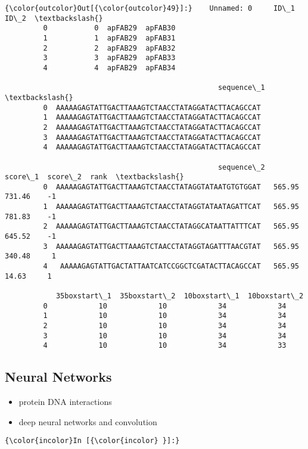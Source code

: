 \documentclass[11pt]{article}
\providecommand{\tightlist}{%
      \setlength{\itemsep}{0pt}\setlength{\parskip}{0pt}}
\begin{document}
            \begin{Verbatim}[commandchars=\\\{\}]
{\color{outcolor}Out[{\color{outcolor}49}]:}    Unnamed: 0     ID\_1     ID\_2  \textbackslash{}
         0           0  apFAB29  apFAB30   
         1           1  apFAB29  apFAB31   
         2           2  apFAB29  apFAB32   
         3           3  apFAB29  apFAB33   
         4           4  apFAB29  apFAB34   
         
                                                  sequence\_1  \textbackslash{}
         0  AAAAAGAGTATTGACTTAAAGTCTAACCTATAGGATACTTACAGCCAT   
         1  AAAAAGAGTATTGACTTAAAGTCTAACCTATAGGATACTTACAGCCAT   
         2  AAAAAGAGTATTGACTTAAAGTCTAACCTATAGGATACTTACAGCCAT   
         3  AAAAAGAGTATTGACTTAAAGTCTAACCTATAGGATACTTACAGCCAT   
         4  AAAAAGAGTATTGACTTAAAGTCTAACCTATAGGATACTTACAGCCAT   
         
                                                  sequence\_2  score\_1  score\_2  rank  \textbackslash{}
         0  AAAAAGAGTATTGACTTAAAGTCTAACCTATAGGTATAATGTGTGGAT   565.95   731.46    -1   
         1  AAAAAGAGTATTGACTTAAAGTCTAACCTATAGGTATAATAGATTCAT   565.95   781.83    -1   
         2  AAAAAGAGTATTGACTTAAAGTCTAACCTATAGGCATAATTATTTCAT   565.95   645.52    -1   
         3  AAAAAGAGTATTGACTTAAAGTCTAACCTATAGGTAGATTTAACGTAT   565.95   340.48     1   
         4   AAAAAGAGTATTGACTATTAATCATCCGGCTCGATACTTACAGCCAT   565.95    14.63     1   
         
            35boxstart\_1  35boxstart\_2  10boxstart\_1  10boxstart\_2  
         0            10            10            34            34  
         1            10            10            34            34  
         2            10            10            34            34  
         3            10            10            34            34  
         4            10            10            34            33  
\end{Verbatim}
        
    \subsection{Neural Networks}\label{neural-networks}

\begin{itemize}
\tightlist
\item
  protein DNA interactions
\item
  deep neural networks and convolution
\end{itemize}

    \begin{Verbatim}[commandchars=\\\{\}]
{\color{incolor}In [{\color{incolor} }]:} 
\end{Verbatim}


    
    
    
    
\end{document}
